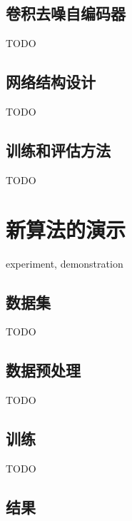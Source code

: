 \subsection{卷积去噪自编码器}

TODO

\subsection{网络结构设计}

TODO

\subsection{训练和评估方法}

TODO


\section{新算法的演示}

experiment, demonstration

\subsection{数据集}

TODO

\subsection{数据预处理}

TODO

\subsection{训练}

TODO

\subsection{结果}

